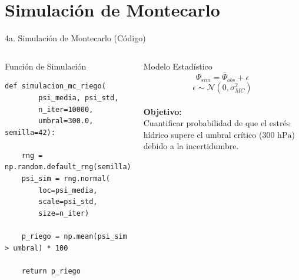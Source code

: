 \documentclass[11pt, aspectratio=169]{beamer}
\begin{document}
\section{Simulación de Montecarlo}

\begin{frame}[fragile]{4a. Simulación de Montecarlo (Código)}
\begin{columns}[c]
\begin{block}{Función de Simulación}
\begin{lstlisting}[numbers=none,frame=none,basicstyle=\ttfamily\small]
def simulacion_mc_riego(
        psi_media, psi_std,
        n_iter=10000,
        umbral=300.0, semilla=42):
        
    rng = np.random.default_rng(semilla)
    psi_sim = rng.normal(
        loc=psi_media,
        scale=psi_std,
        size=n_iter)
        
    p_riego = np.mean(psi_sim > umbral) * 100
    
    return p_riego
\end{lstlisting}
\end{block}

\begin{alertblock}{Modelo Estadístico}
$$\Psi_{sim} = \bar{\Psi}_{obs} + \epsilon$$
$$\epsilon \sim \mathcal{N}(0,\sigma_{MC}^2)$$
\vspace{0.3cm}\\
\textbf{Objetivo:}\\
Cuantificar probabilidad de que el estrés hídrico supere el umbral crítico ($300\text{ hPa}$) debido a la incertidumbre.
\end{alertblock}
\end{columns}
\end{frame}
\end{document}
